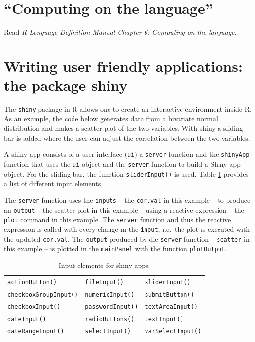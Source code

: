 \documentclass[
]{book}
\begin{document}
\section{``Computing on the language''}\label{computing-on-the-language}

Read \emph{R Language Definition Manual Chapter 6: Computing on the language}.

\section{Writing user friendly applications: the package shiny}\label{writing-user-friendly-applications-the-package-shiny}

The \texttt{shiny} package in R allows one to create an interactive environment inside R. As an example, the code below generates data from a bivariate normal distribution and makes a scatter plot of the two variables. With shiny a sliding bar is added where the user can adjust the correlation between the two variables.

A shiny app consists of a user interface (\texttt{ui}) a \texttt{server} function and the \texttt{shinyApp} function that uses the \texttt{ui} object and the \texttt{server} function to build a Shiny app object. For the sliding bar, the function \texttt{sliderInput()} is used. Table \ref{tab:InputElements} provides a list of different input elements.

The \texttt{server} function uses the \texttt{inputs} -- the \texttt{cor.val} in this example -- to produce an \texttt{output} -- the scatter plot in this example -- using a reactive expression -- the \texttt{plot} command in this example. The \texttt{server} function and thus the reactive expression is called with every change in the \texttt{input}, i.e.~the plot is executed with the updated \texttt{cor.val}. The \texttt{output} produced by die \texttt{server} function -- \texttt{scatter} in this example -- is plotted in the \texttt{mainPanel} with the function \texttt{plotOutput}.

\begin{longtable}[]{@{}lll@{}}
\caption{\label{tab:InputElements} Input elements for shiny apps.}\tabularnewline
\toprule\noalign{}
\endfirsthead
\endhead
\bottomrule\noalign{}
\endlastfoot
\texttt{actionButton()} & \texttt{fileInput()} & \texttt{sliderInput()} \\
\texttt{checkboxGroupInput()} & \texttt{numericInput()} & \texttt{submitButton()} \\
\texttt{checkboxInput()} & \texttt{passwordInput()} & \texttt{textAreaInput()} \\
\texttt{dateInput()} & \texttt{radioButtons()} & \texttt{textInput()} \\
\texttt{dateRangeInput()} & \texttt{selectInput()} & \texttt{varSelectInput()} \\
\end{longtable}
\end{document}
